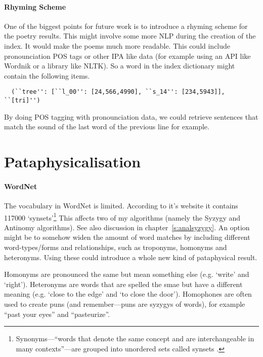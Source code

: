 \paragraph{Rhyming Scheme} 
One of the biggest points for future work is to introduce a rhyming scheme for the poetry results. This might involve some more \ac{NLP} during the creation of the index. It would make the poems much more readable. This could include pronounciation \ac{POS} tags or other \ac{IPA} like data (for example using an \ac{API} like Wordnik \autocite{Wordnik2016} or a library like \ac{NLTK}). So a word in the index dictionary might contain the following items.

\begin{verbatim}
  (``tree'': [``l_00'': [24,566,4990], ``s_14'': [234,5943]], ``[tri]'')
\end{verbatim}

By doing \ac{POS} tagging with pronounciation data, we could retrieve sentences that match the sound of the last word of the previous line for example.


\section{Pataphysicalisation}
\label{s:pataasp}

\paragraph{WordNet}
The vocabulary in WordNet is limited. According to it's website \autocite{Princeton2010} it contains \num{117000} `synsets'\footnote{Synonyms---``words that denote the same concept and are interchangeable in many contexts''---are grouped into unordered sets called synsets \autocite{Princeton2010}.} This affects two of my algorithms (namely the Syzygy and Antinomy algorithms). See also discussion in chapter~\ref{s:analsyzygy}. An option might be to somehow widen the amount of word matches by including different word-types/forms and relationships, such as troponyms, homonyms and heteronyms. Using these could introduce a whole new kind of pataphysical result. 

Homonyms are pronounced the same but mean something else (e.g. `write' and `right'). Heteronyms are words that are spelled the smae but have a different meaning (e.g. `close to the edge' and `to close the door'). Homophones are often used to create puns (and remember---puns are syzygys of words), for example ``past your eyes'' and ``pasteurize''. 

